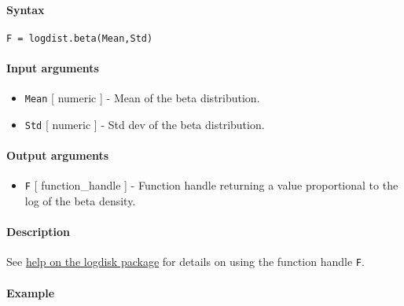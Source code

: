 


	\paragraph{Syntax}\label{syntax}

\begin{verbatim}
F = logdist.beta(Mean,Std)
\end{verbatim}

\paragraph{Input arguments}\label{input-arguments}

\begin{itemize}
\item
  \texttt{Mean} {[} numeric {]} - Mean of the beta distribution.
\item
  \texttt{Std} {[} numeric {]} - Std dev of the beta distribution.
\end{itemize}

\paragraph{Output arguments}\label{output-arguments}

\begin{itemize}
\itemsep1pt\parskip0pt
\item
  \texttt{F} {[} function\_handle {]} - Function handle returning a
  value proportional to the log of the beta density.
\end{itemize}

\paragraph{Description}\label{description}

See \href{logdist/Contents}{help on the logdisk package} for details on
using the function handle \texttt{F}.

\paragraph{Example}\label{example}


